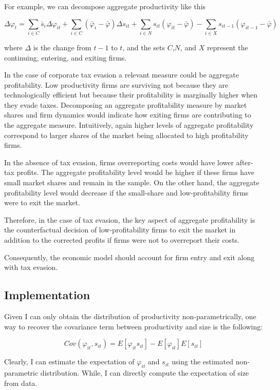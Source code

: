 \documentclass[
  12pt]{article}
\theoremstyle{definition}
\theoremstyle{remark}
\begin{document}
For example, we can decompose aggregate productivity like this

\[
\Delta\varphi_t = \sum_{i \in C}\bar s_i \Delta\varphi_{it} + \sum_{i\in C}(\bar\varphi_i-\bar\varphi)\Delta s_{it}+\sum_{i\in N} s_{it}\left(\varphi_{it}-\bar\varphi\right)-\sum_{i\in X}s_{it-1}\left(\varphi_{it-1}-\bar \varphi\right)
\]

where \(\Delta\) is the change from \(t-1\) to \(t\), and the sets
\(C\),\(N\), and \(X\) represent the continuing, entering, and exiting
firms.

In the case of corporate tax evasion a relevant measure could be
aggregate profitability. Low productivity firms are surviving not
because they are technologically efficient but because their
profitability is marginally higher when they evade taxes. Decomposing an
aggregate profitability measure by market shares and firm dynamics would
indicate how exiting firms are contributing to the aggregate measure.
Intuitively, again higher levels of aggregate profitability correspond
to larger shares of the market being allocated to high profitability
firms.

In the absence of tax evasion, firms overreporting costs would have
lower after-tax profits. The aggregate profitability level would be
higher if these firms have small market shares and remain in the sample.
On the other hand, the aggregate profitability level would decrease if
the small-share and low-profitability firms were to exit the market.

Therefore, in the case of tax evasion, the key aspect of aggregate
profitability is the counterfactual decision of low-profitability firms
to exit the market in addition to the corrected profits if firms were
not to overreport their costs.

Consequently, the economic model should account for firm entry and exit
along with tax evasion.

\subsection{Implementation}\label{implementation-1}

Given I can only obtain the distribution of productivity
non-parametrically, one way to recover the covariance term between
productivity and size is the following:

\[
Cov(\varphi_{it}, s_{it}) = E[\varphi_{it} s_{it}] - E[\varphi_{it}]E[s_{it}]
\]

Clearly, I can estimate the expectation of \(\varphi_{it}\) and
\(s_{it}\) using the estimated non-parametric distribution. While, I can
directly compute the expectation of size from data.
\end{document}
